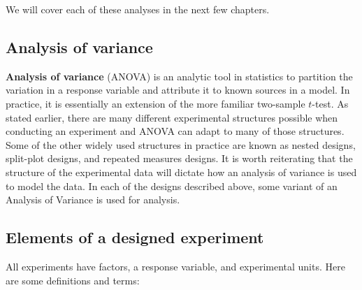 \documentclass[
]{book}
\begin{document}
We will cover each of these analyses in the next few chapters.

\hypertarget{analysis-of-variance}{%
\subsection{Analysis of variance}\label{analysis-of-variance}}

\textbf{Analysis of variance} (ANOVA) is an analytic tool in statistics to partition the variation in a response variable and attribute it to known sources in a model.
In practice, it is essentially an extension of the more familiar two-sample \(t\)-test.
As stated earlier, there are many different experimental structures possible when conducting an experiment and ANOVA can adapt to many of those structures.
Some of the other widely used structures in practice are known as nested designs, split-plot designs, and repeated measures designs.
It is worth reiterating that the structure of the experimental data will dictate how an analysis of variance is used to model the data.
In each of the designs described above, some variant of an Analysis of Variance is used for analysis.

\hypertarget{elements-of-a-designed-experiment}{%
\subsection{Elements of a designed experiment}\label{elements-of-a-designed-experiment}}

All experiments have factors, a response variable, and experimental units.
Here are some definitions and terms:
\end{document}

